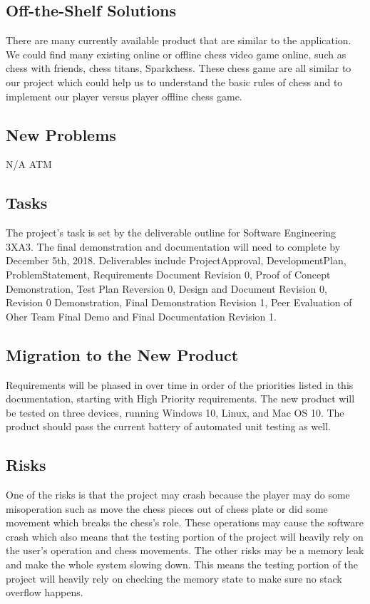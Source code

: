 \documentclass[12pt, titlepage]{article}
\begin{document}
\subsection{Off-the-Shelf Solutions}
There are many currently available product that are similar to the application. We could find many existing online or offline chess video game online, such as chess with friends, chess titans, Sparkchess. These chess game are all similar to our project which could help us to understand the basic rules of chess and to implement our player versus player offline chess game.

\subsection{New Problems}
N/A ATM

\subsection{Tasks}
The project's task is set by the deliverable outline for Software Engineering 3XA3. The final demonstration and documentation will need to complete by December 5th, 2018. Deliverables include ProjectApproval, DevelopmentPlan, ProblemStatement, Requirements Document Revision 0, Proof of Concept Demonstration, Test Plan Reversion 0, Design and Document Revision 0, Revision 0 Demonstration, Final Demonstration Revision 1, Peer Evaluation of Oher Team Final Demo and Final Documentation Revision 1.

\subsection{Migration to the New Product}
Requirements will be phased in over time in order of the priorities listed in this documentation, starting with High Priority requirements. The new product will be tested on three devices, running Windows 10, Linux, and Mac OS 10. The product should pass the current battery of automated unit testing as well.

\subsection{Risks}
One of the risks is that the project may crash because the player may do some misoperation such as move the chess pieces out of chess plate or did some movement which breaks the chess's role. These operations may cause the software crash which also means that the testing portion of the project will heavily rely on the user's operation and chess movements. The other risks may be a memory leak and make the whole system slowing down. This means the testing portion of the project will heavily rely on checking the memory state to make sure no stack overflow happens.
\end{document}
